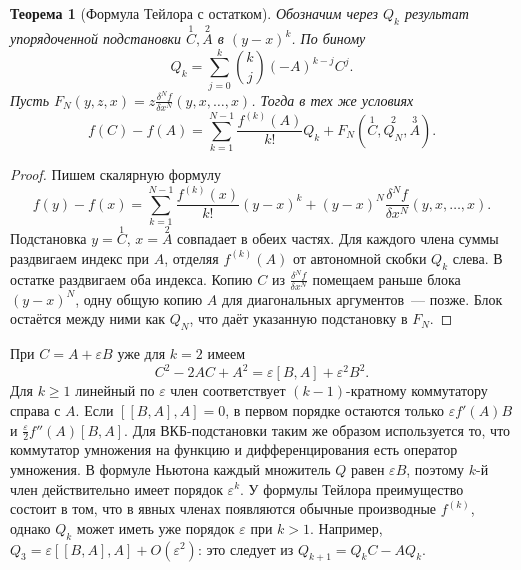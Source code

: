 \documentclass[11pt,a4paper]{article}
\theoremstyle{plain}
\newtheorem{theorem}{Теорема}[section]
\theoremstyle{definition}
\newcommand{\ddiff}[2][]{\frac{\delta^{#1}#2}{\delta x^{#1}}}
\begin{document}
\begin{theorem}[Формула Тейлора с остатком]
Обозначим через $Q_k$ результат упорядоченной подстановки
$\overset1 C,\overset2 A$ в $(y-x)^k$. По биному
\[
 Q_k=\sum_{j=0}^k\binom{k}{j}(-A)^{k-j}C^j .
\]
Пусть $F_N(y,z,x)=z \ddiff[N]{f}(y,x,\ldots,x)$.
Тогда в тех же условиях
\[
 f(C)-f(A)=\sum_{k=1}^{N-1}\frac{f^{(k)}(A)}{k!}Q_k+
             F_N(\overset1 C,\overset2{Q_N},\overset3 A).
\]
\end{theorem}
\begin{proof}
Пишем скалярную формулу
\[
 f(y)-f(x)
  =\sum_{k=1}^{N-1}\frac{f^{(k)}(x)}{k!}(y-x)^k
   +(y-x)^N \ddiff[N]{f}(y,x,\ldots,x).
\]
Подстановка $y=\overset1 C$, $x=\overset2 A$
совпадает в обеих частях. Для каждого члена суммы
раздвигаем индекс при $A$, отделяя $f^{(k)}(A)$ от
автономной скобки $Q_k$ слева. В остатке раздвигаем
оба индекса. Копию $C$ из $\ddiff[N]{f}$ помещаем раньше
блока $(y-x)^N$, одну общую копию $A$ для диагональных
аргументов~--- позже. Блок остаётся между ними как
$Q_N$, что даёт указанную подстановку в $F_N$.
\end{proof}
При $C=A+\varepsilon B$ уже для $k=2$ имеем
\[
 C^2-2AC+A^2=\varepsilon[B,A]+\varepsilon^2B^2 .
\]
Для $k\ge1$ линейный по $\varepsilon$ член соответствует
$(k-1)$-кратному коммутатору справа с $A$. Если
$[[B,A],A]=0$, в первом порядке остаются только
$\varepsilon f'(A)B$ и
$\tfrac{\varepsilon}{2}f''(A)[B,A]$.
Для ВКБ-подстановки таким же образом используется то, что
коммутатор умножения на функцию и дифференцирования
есть оператор умножения. В формуле Ньютона каждый
множитель $Q$ равен $\varepsilon B$, поэтому $k$-й
член действительно имеет порядок $\varepsilon^k$.
У формулы Тейлора преимущество состоит в том, что
в явных членах появляются обычные производные
$f^{(k)}$, однако $Q_k$ может иметь уже порядок
$\varepsilon$ при $k>1$. Например,
$Q_3=\varepsilon[[B,A],A]+O(\varepsilon^2)$:
это следует из $Q_{k+1}=Q_kC-AQ_k$.
\end{document}
